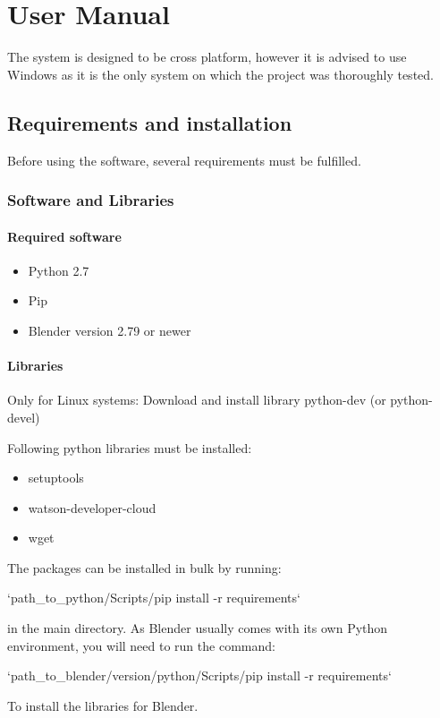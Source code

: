 \chapter{User Manual \label{chap:usermanual}}
The system is designed to be cross platform, however it is advised to use Windows as it is the only system on which the project was thoroughly tested.

\section{Requirements and installation \label{sec:requirements}}
Before using the software, several requirements must be fulfilled.

\subsection{Software and Libraries}
\subsubsection{Required software}
\begin{itemize}
	\item Python 2.7
	\item Pip
	\item Blender version 2.79 or newer
\end{itemize}

\subsubsection{Libraries}
Only for Linux systems: Download and install library python-dev (or python-devel)

Following python libraries must be installed:
\begin{itemize}
	\item setuptools
	\item watson-developer-cloud
	\item wget
\end{itemize}
\noindent The packages can be installed in bulk by running:

\indent `path\_to\_python/Scripts/pip install -r requirements`

\noindent in the main directory. As Blender usually comes with its own Python environment, you will need to run the command:

\indent `path\_to\_blender/version/python/Scripts/pip install -r requirements`

\noindent To install the libraries for Blender.

